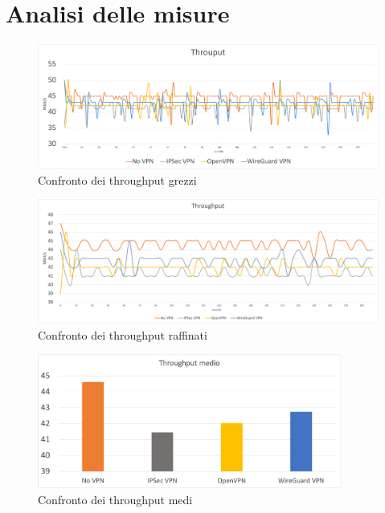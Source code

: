 \section{Analisi delle misure}
\begin{figure}[ht]
    \centering
    \includegraphics[width=14cm]{figure/rawThroughput.png}
    \caption{Confronto dei throughput grezzi}
\end{figure}

\begin{figure}[ht]
    \centering
    \includegraphics[width=14cm]{figure/fineThroughput.png}
    \caption{Confronto dei throughput raffinati}
\end{figure}

\begin{figure}[ht]
    \centering
    \includegraphics[width=10cm]{figure/avg.png}
    \caption{Confronto dei throughput medi}
\end{figure}